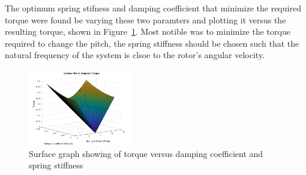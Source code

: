                 The optimum spring stifness and damping coefficient that minimize the required torque were found be varying these two paramters and plotting it versus the resulting torque, shown in Figure~\ref{fig: 3d_plot}. Most notible was to minimize the torque required to change the pitch, the spring stiffness should be chosen such that the natural frequency of the system is clsoe to the rotor's angular velocity.
                \begin{figure}[H]
                    \centering
                    \includegraphics*[width = 0.4\textwidth]{figs/Model/Pitch/Torque_stiffness_damping_surface.png}
                    \caption[Torque surface graph]{Surface graph showing of torque versus damping coefficient and spring stiffness}
                    \label{fig: 3d_plot}
                \end{figure}

